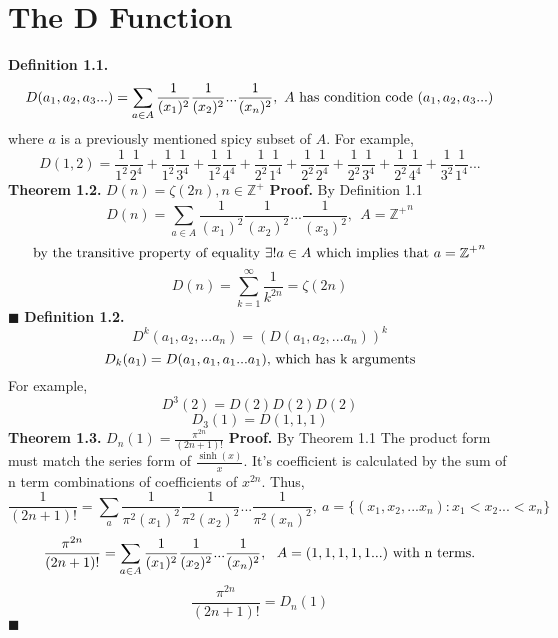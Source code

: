 \documentclass[12pt]{article}
\begin{document}
\newpage
\section{The D Function}
\textbf{Definition 1.1.}
\[D(a_1,a_2,a_3...)=\sum_{a\in A}\frac{1}{(x_1)^2}\frac{1}{(x_2)^2}...\frac{1}{(x_n)^2},\ A \textup{ has condition code } (a_1,a_2,a_3...)\]
where \(a\) is a previously mentioned spicy subset of \(A\). \newline
For example, \[D(1,2)=\frac{1}{1^2}\frac{1}{2^4}+\frac{1}{1^2}\frac{1}{3^4}+\frac{1}{1^2}\frac{1}{4^4}+\frac{1}{2^2}\frac{1}{1^4}+\frac{1}{2^2}\frac{1}{2^4}+\frac{1}{2^2}\frac{1}{3^4}+\frac{1}{2^2}\frac{1}{4^4}+\frac{1}{3^2}\frac{1}{1^4}...\]
\newline
\textbf{Theorem 1.2.}
\(D(n)=\zeta(2n), n\in\mathbb{Z}^+\) \newline
\textbf{Proof.} \newline
By Definition 1.1
\[D(n)=\sum_{a\in A}\frac{1}{(x_1)^{2}}\frac{1}{(x_2)^{2}}...\frac{1}{(x_3)^{2}},\ \ A={\mathbb{Z}^+}^n\]
\[\textup{by the transitive property of equality } \exists!a\in A \textup{ which implies that } a = {\mathbb{Z}^+}^n\]
\[D(n)=\sum_{k=1}^{\infty}\frac{1}{k^{2n}}=\zeta(2n)\]
\(\blacksquare\) \newline
\textbf{Definition 1.2.}
\[D^{k}(a_1,a_2,...a_n)=\left(D(a_1,a_2,...a_n)\right)^k\]
\[D_k(a_1)=D(a_1,a_1,a_1...a_1) \textup{, which has k arguments}\]
For example,
\[D^3(2)=D(2)D(2)D(2)\]
\[D_3(1)=D(1,1,1)\]
\textbf{Theorem 1.3.} \(D_n(1)= \frac{\pi^{2n}}{(2n+1)!}\) \newline
\textbf{Proof.} \newline
By Theorem 1.1 The product form must match the series form of \(\frac{\sinh(x)}{x}\). It's coefficient is calculated by the sum of n term combinations of coefficients of \(x^{2n}\). Thus,
\[\frac{1}{(2n+1)!}=\sum_a\frac{1}{\pi^{2}(x_1)^2}\frac{1}{\pi^{2}(x_2)^2}...\frac{1}{\pi^{2}(x_n)^2},\ a=\{(x_1,x_2,...x_n):x_1< x_2...< x_n\} \]
\[\frac{\pi^{2n}}{(2n+1)!}=\sum_{a\in A}\frac{1}{(x_1)^{2}}\frac{1}{(x_2)^{2}}...\frac{1}{(x_n)^{2}},\ \ A=(1,1,1,1,1...) \textup{ with n terms.}\]
\[\frac{\pi^{2n}}{(2n+1)!}=D_n(1)\]
\(\blacksquare\)
\newpage
\end{document}
